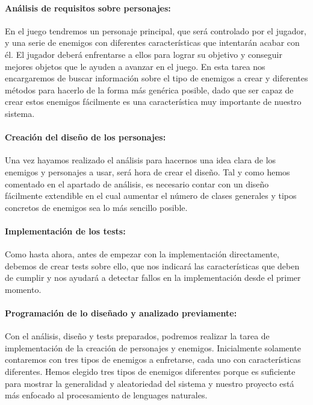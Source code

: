\paragraph{Análisis de requisitos sobre personajes:} En el juego tendremos un personaje principal, que será controlado por el jugador, y una serie de enemigos con diferentes características que intentarán acabar con él. El jugador deberá enfrentarse a ellos para lograr su objetivo y conseguir mejores objetos que le ayuden a avanzar en el juego. En esta tarea nos encargaremos de buscar información sobre el tipo de enemigos a crear y diferentes métodos para hacerlo de la forma más genérica posible, dado que ser capaz de crear estos enemigos fácilmente es una característica muy importante de nuestro sistema.

\paragraph{Creación del diseño de los personajes:} Una vez hayamos realizado el análisis para hacernos una idea clara de los enemigos y personajes a usar, será hora de crear el diseño. Tal y como hemos comentado en el apartado de análisis, es necesario contar con un diseño fácilmente extendible en el cual aumentar el número de clases generales y tipos concretos de enemigos sea lo más sencillo posible.

\paragraph{Implementación de los tests:} Como hasta ahora, antes de empezar con la implementación directamente, debemos de crear tests sobre ello, que nos indicará las características que deben de cumplir y nos ayudará a detectar fallos en la implementación desde el primer momento.

\paragraph{Programación de lo diseñado y analizado previamente:} Con el análisis, diseño y tests preparados, podremos realizar la tarea de implementación de la creación de personajes y enemigos. Inicialmente solamente contaremos con tres tipos de enemigos a enfretarse, cada uno con características diferentes. Hemos elegido tres tipos de enemigos diferentes porque es suficiente para mostrar la generalidad y aleatoriedad del sistema y nuestro proyecto está más enfocado al procesamiento de lenguages naturales.

